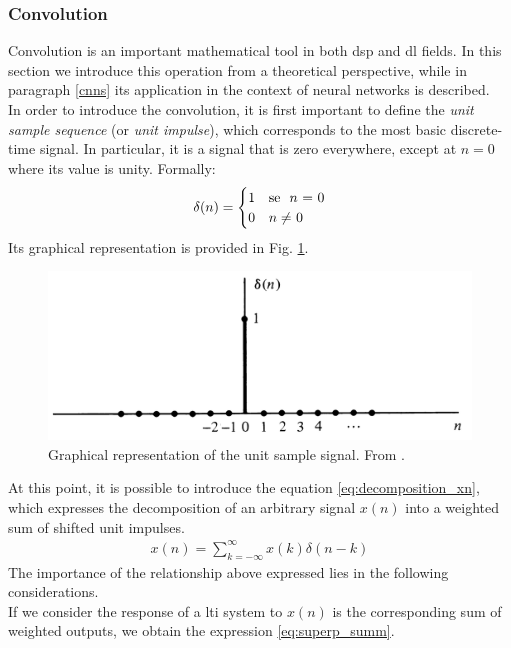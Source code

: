 \subsubsection{Convolution}
Convolution is an important mathematical tool in both \gls{dsp} and \gls{dl} fields. In this section we introduce this operation from a theoretical perspective, while in paragraph \ref{cnns} its application in the context of neural networks is described. \\
In order to introduce the convolution, it is first important to define the \textit{unit sample sequence} (or \textit{unit impulse}), which corresponds to the most basic discrete-time signal. In particular, it is a signal that is zero everywhere, except at $n = 0$ where its value is unity. Formally:
\begin{align}
	\delta(n) = \begin{cases} 1 & \mbox{se } \mbox{ $n$ = 0} \\ 0 & \mbox{$ n\neq$ 0} \end{cases}  
\end{align}
\noindent Its graphical representation is provided in Fig. \ref{fig:unit}.
\begin{figure}[H]
	\begin{center}
		\includegraphics[scale=0.4]{img/unit.png}
		\captionsetup{margin=2cm}
		\caption{Graphical representation of
			the unit sample signal. From \cite{proakis2006dimitris}.} 
		\label{fig:unit}
	\end{center}
\end{figure}

\noindent At this point, it is possible to introduce the equation \ref{eq:decomposition_xn}, which expresses the decomposition of an arbitrary signal $x(n)$ into a weighted sum of shifted unit impulses.
\begin{align} \label{eq:decomposition_xn}
	x(n) =  \sum_{k = - \infty}^{\infty}x(k)\delta(n-k)
\end{align}
\noindent The importance of the relationship above expressed lies in the following considerations. \\
If we consider the response of a \gls{lti} system to $x(n)$ is the corresponding sum of weighted outputs, we obtain the expression \ref{eq:superp_summ}. 

